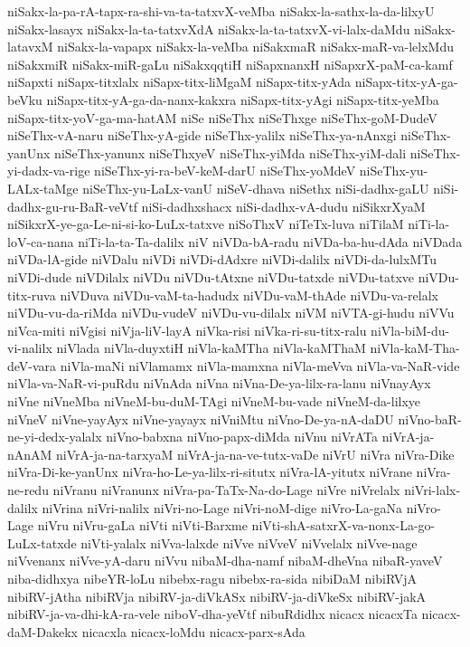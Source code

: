 {niSakx-la-pa-rA-tapx-ra-shi-va-ta-tatxvX-veMba
niSakx-la-sathx-la-da-lilxyU
niSakx-lasayx
niSakx-la-ta-tatxvXdA
niSakx-la-ta-tatxvX-vi-lalx-daMdu
niSakx-latavxM
niSakx-la-vapapx
niSakx-la-veMba
niSakxmaR
niSakx-maR-va-lelxMdu
niSakxmiR
niSakx-miR-gaLu
niSakxqqtiH
niSapxnanxH
niSapxrX-paM-ca-kamf
niSapxti
niSapx-titxlalx
niSapx-titx-liMgaM
niSapx-titx-yAda
niSapx-titx-yA-ga-beVku
niSapx-titx-yA-ga-da-nanx-kakxra
niSapx-titx-yAgi
niSapx-titx-yeMba
niSapx-titx-yoV-ga-ma-hatAM
niSe
niSeThx
niSeThxge
niSeThx-goM-DudeV
niSeThx-vA-naru
niSeThx-yA-gide
niSeThx-yalilx
niSeThx-ya-nAnxgi
niSeThx-yanUnx
niSeThx-yanunx
niSeThxyeV
niSeThx-yiMda
niSeThx-yiM-dali
niSeThx-yi-dadx-va-rige
niSeThx-yi-ra-beV-keM-darU
niSeThx-yoMdeV
niSeThx-yu-LALx-taMge
niSeThx-yu-LaLx-vanU
niSeV-dhava
niSethx
niSi-dadhx-gaLU
niSi-dadhx-gu-ru-BaR-veVtf
niSi-dadhxshacx
niSi-dadhx-vA-dudu
niSikxrXyaM
niSikxrX-ye-ga-Le-ni-si-ko-LuLx-tatxve
niSoThxV
niTeTx-luva
niTilaM
niTi-la-loV-ca-nana
niTi-la-ta-Ta-dalilx
niV
niVDa-bA-radu
niVDa-ba-hu-dAda
niVDada
niVDa-lA-gide
niVDalu
niVDi
niVDi-dAdxre
niVDi-dalilx
niVDi-da-lulxMTu
niVDi-dude
niVDilalx
niVDu
niVDu-tAtxne
niVDu-tatxde
niVDu-tatxve
niVDu-titx-ruva
niVDuva
niVDu-vaM-ta-hadudx
niVDu-vaM-thAde
niVDu-va-relalx
niVDu-vu-da-riMda
niVDu-vudeV
niVDu-vu-dilalx
niVM
niVTA-gi-hudu
niVVu
niVca-miti
niVgisi
niVja-liV-layA
niVka-risi
niVka-ri-su-titx-ralu
niVla-biM-du-vi-nalilx
niVlada
niVla-duyxtiH
niVla-kaMTha
niVla-kaMThaM
niVla-kaM-Tha-deV-vara
niVla-maNi
niVlamamx
niVla-mamxna
niVla-meVva
niVla-va-NaR-vide
niVla-va-NaR-vi-puRdu
niVnAda
niVna
niVna-De-ya-lilx-ra-lanu
niVnayAyx
niVne
niVneMba
niVneM-bu-duM-TAgi
niVneM-bu-vade
niVneM-da-lilxye
niVneV
niVne-yayAyx
niVne-yayayx
niVniMtu
niVno-De-ya-nA-daDU
niVno-baR-ne-yi-dedx-yalalx
niVno-babxna
niVno-papx-diMda
niVnu
niVrATa
niVrA-ja-nAnAM
niVrA-ja-na-tarxyaM
niVrA-ja-na-ve-tutx-vaDe
niVrU
niVra
niVra-Dike
niVra-Di-ke-yanUnx
niVra-ho-Le-ya-lilx-ri-situtx
niVra-lA-yitutx
niVrane
niVra-ne-redu
niVranu
niVranunx
niVra-pa-TaTx-Na-do-Lage
niVre
niVrelalx
niVri-lalx-dalilx
niVrina
niVri-nalilx
niVri-no-Lage
niVri-noM-dige
niVro-La-gaNa
niVro-Lage
niVru
niVru-gaLa
niVti
niVti-Barxme
niVti-shA-satxrX-va-nonx-La-go-LuLx-tatxde
niVti-yalalx
niVva-lalxde
niVve
niVveV
niVvelalx
niVve-nage
niVvenanx
niVve-yA-daru
niVvu
nibaM-dha-namf
nibaM-dheVna
nibaR-yaveV
niba-didhxya
nibeYR-loLu
nibebx-ragu
nibebx-ra-sida
nibiDaM
nibiRVjA
nibiRV-jAtha
nibiRVja
nibiRV-ja-diVkASx
nibiRV-ja-diVkeSx
nibiRV-jakA
nibiRV-ja-va-dhi-kA-ra-vele
niboV-dha-yeVtf
nibuRdidhx
nicacx
nicacxTa
nicacx-daM-Dakekx
nicacxla
nicacx-loMdu
nicacx-parx-sAda
}
